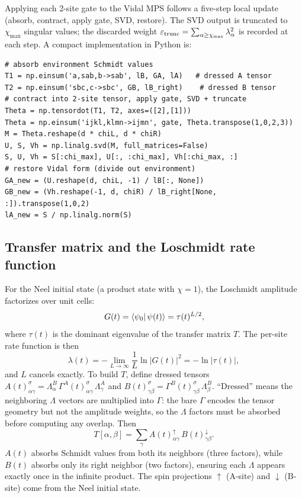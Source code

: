\documentclass[11pt,a4paper]{article}
\begin{document}
Applying each 2-site gate to the Vidal MPS follows a five-step local update
(absorb, contract, apply gate, SVD, restore). The SVD output is truncated to
$\chi_{\max}$ singular values; the discarded weight $\varepsilon_{\rm trunc} = \sum_{\alpha\geq\chi_{\max}} \lambda_\alpha^2$
is recorded at each step. A compact implementation in Python is:

\begin{minipage}{\linewidth}
\begin{lstlisting}
# absorb environment Schmidt values
T1 = np.einsum('a,sab,b->sab', lB, GA, lA)   # dressed A tensor
T2 = np.einsum('sbc,c->sbc', GB, lB_right)    # dressed B tensor
# contract into 2-site tensor, apply gate, SVD + truncate
Theta = np.tensordot(T1, T2, axes=([2],[1]))
Theta = np.einsum('ijkl,klmn->ijmn', gate, Theta.transpose(1,0,2,3))
M = Theta.reshape(d * chiL, d * chiR)
U, S, Vh = np.linalg.svd(M, full_matrices=False)
S, U, Vh = S[:chi_max], U[:, :chi_max], Vh[:chi_max, :]
# restore Vidal form (divide out environment)
GA_new = (U.reshape(d, chiL, -1) / lB[:, None])
GB_new = (Vh.reshape(-1, d, chiR) / lB_right[None, :]).transpose(1,0,2)
lA_new = S / np.linalg.norm(S)
\end{lstlisting}
\end{minipage}

\subsection{Transfer matrix and the Loschmidt rate function}
\label{sec:transfer}

For the Neel initial state (a product state with $\chi=1$), the Loschmidt
amplitude factorizes over unit cells:
\begin{equation}
  G(t) = \bra{\psi_0}\psi(t)\rangle = \tau(t)^{L/2},
\end{equation}
where $\tau(t)$ is the dominant eigenvalue of the transfer matrix $T$. The
per-site rate function is then
\begin{equation}
  \lambda(t) = -\lim_{L\to\infty}\frac{1}{L}\ln|G(t)|^2 = -\ln|\tau(t)|,
  \label{eq:lambda}
\end{equation}
and $L$ cancels exactly. To build $T$, define dressed tensors
$A(t)^\sigma_{\alpha\gamma} = \Lambda^B_\alpha\, \Gamma^A(t)^\sigma_{\alpha\gamma}\, \Lambda^A_\gamma$
and $B(t)^\sigma_{\gamma\beta} = \Gamma^B(t)^\sigma_{\gamma\beta}\, \Lambda^B_\beta$.
``Dressed'' means the neighboring $\Lambda$ vectors are multiplied into $\Gamma$:
the bare $\Gamma$ encodes the tensor geometry but not the amplitude weights,
so the $\Lambda$ factors must be absorbed before computing any overlap.
Then
\begin{equation}
  T[\alpha,\beta] = \sum_\gamma A(t)^\uparrow_{\alpha\gamma}\, B(t)^\downarrow_{\gamma\beta}.
  \label{eq:transfer}
\end{equation}
$A(t)$ absorbs Schmidt values from both its neighbors (three factors), while
$B(t)$ absorbs only its right neighbor (two factors), ensuring each $\Lambda$
appears exactly once in the infinite product. The spin projections $\uparrow$
(A-site) and $\downarrow$ (B-site) come from the Neel initial state.
\end{document}
